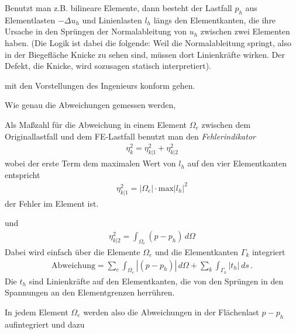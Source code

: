 {{{{{Benutzt man z.B. bilineare Elemente, dann besteht der Lastfall $p_h$ aus Elementlasten $- \Delta u_h$ und Linienlasten $l_h$ l\"{a}ngs den Elementkanten, die ihre Ursache in den Spr\"{u}ngen der Normalableitung von $u_h$ zwischen zwei Elementen haben. (Die Logik ist dabei die folgende: Weil die Normalableitung springt, also in der Biegefl\"{a}che Knicke zu sehen sind, m\"{u}ssen dort Linienkr\"{a}fte wirken. Der Defekt, die Knicke, wird sozusagen statisch interpretiert).

mit den Vorstellungen des Ingenieurs konform gehen.

Wie genau die Abweichungen gemessen werden,

Als Ma{\ss}zahl f\"{u}r die Abweichung in einem Element $\Omega_e$ zwischen dem Originallastfall und dem FE-Lastfall benutzt man den {\em Fehlerindikator\/}
\begin{align}
\eta_k^2 = \eta_{k|1}^2 + \eta_{k|2}^2
\end{align}
wobei der erste Term dem maximalen Wert von $l_h$ auf den vier Elementkanten entspricht
\begin{align}
\eta_{k|1}^2 = |\Omega_e| \cdot \text{max} |l_h|^2
\end{align}
der Fehler im Element ist.

und
\begin{align}
\eta_{k|2}^2 = \int_{\Omega_e} (p - p_h)\,d\Omega
\end{align}
Dabei wird einfach \"{u}ber die Elemente $\Omega_e$ und die Elementkanten $\Gamma_k$ integriert
\begin{align}
\text{Abweichung} = \sum_e \int_{\Omega_e} |(p - p_h)|\,d\Omega + \sum_k \int_{\Gamma_k} |t_h|\,ds\,.
\end{align}
Die $t_h$ sind Linienkr\"{a}fte auf den Elementkanten, die von den Spr\"{u}ngen in den Spannungen an den Elementgrenzen herr\"{u}hren.

In jedem Element $\Omega_e$ werden also die Abweichungen in der Fl\"{a}chenlast $p - p_h$ aufintegriert und dazu

}}}}}
